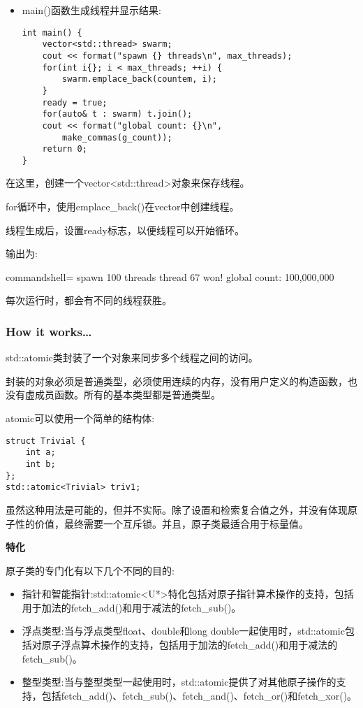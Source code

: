 \begin{itemize}
\item 
main()函数生成线程并显示结果:

\begin{lstlisting}[style=styleCXX]
int main() {
	vector<std::thread> swarm;
	cout << format("spawn {} threads\n", max_threads);
	for(int i{}; i < max_threads; ++i) {
		swarm.emplace_back(countem, i);
	}
	ready = true;
	for(auto& t : swarm) t.join();
	cout << format("global count: {}\n",
		make_commas(g_count));
	return 0;
}
\end{lstlisting}

\end{itemize}

在这里，创建一个vector<std::thread>对象来保存线程。

for循环中，使用emplace\_back()在vector中创建线程。

线程生成后，设置ready标志，以便线程可以开始循环。

输出为:

\begin{tcblisting}{commandshell={}}
spawn 100 threads
thread 67 won!
global count: 100,000,000
\end{tcblisting}

每次运行时，都会有不同的线程获胜。

\subsubsection{How it works…}

std::atomic类封装了一个对象来同步多个线程之间的访问。

封装的对象必须是普通类型，必须使用连续的内存，没有用户定义的构造函数，也没有虚成员函数。所有的基本类型都是普通类型。

atomic可以使用一个简单的结构体:

\begin{lstlisting}[style=styleCXX]
struct Trivial {
	int a;
	int b;
};
std::atomic<Trivial> triv1;
\end{lstlisting}

虽然这种用法是可能的，但并不实际。除了设置和检索复合值之外，并没有体现原子性的价值，最终需要一个互斥锁。并且，原子类最适合用于标量值。

\noindent
\textbf{特化}

原子类的专门化有以下几个不同的目的:

\begin{itemize}
\item 
指针和智能指针:std::atomic<U*>特化包括对原子指针算术操作的支持，包括用于加法的fetch\_add()和用于减法的fetch\_sub()。

\item 
浮点类型:当与浮点类型float、double和long double一起使用时，std::atomic包括对原子浮点算术操作的支持，包括用于加法的fetch\_add()和用于减法的fetch\_sub()。

\item 
整型类型:当与整型类型一起使用时，std::atomic提供了对其他原子操作的支持，包括fetch\_add()、fetch\_sub()、fetch\_and()、fetch\_or()和fetch\_xor()。

\end{itemize}


